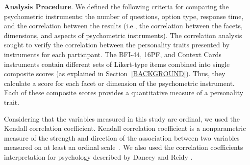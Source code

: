 \textbf{Analysis Procedure}. We defined the following criteria for comparing the psychometric instruments: the number of questions, option type, response time, and the correlation between the results (i.e., the correlation between the facets, dimensions, and aspects of psychometric instruments). The correlation analysis sought to verify the correlation between the personality traits presented by instruments for each participant. The BFI-44, 16PF, and Context Cards instruments contain different sets of Likert-type items combined into single composite scores (as explained in Section~\ref{BACKGROUND}). Thus, they calculate a score for each facet or dimension of the psychometric instrument. Each of these composite scores provides a quantitative measure of a personality trait. 

Considering that the variables measured in this study are ordinal, we used the Kendall correlation coefficient. Kendall correlation coefficient is a nonparametric measure of the strength and direction of the association between two variables measured on at least an ordinal scale~\cite{puth2015effective}. We also used the correlation coefficients interpretation for psychology described by Dancey and Reidy \cite{dancey2007statistics}.













